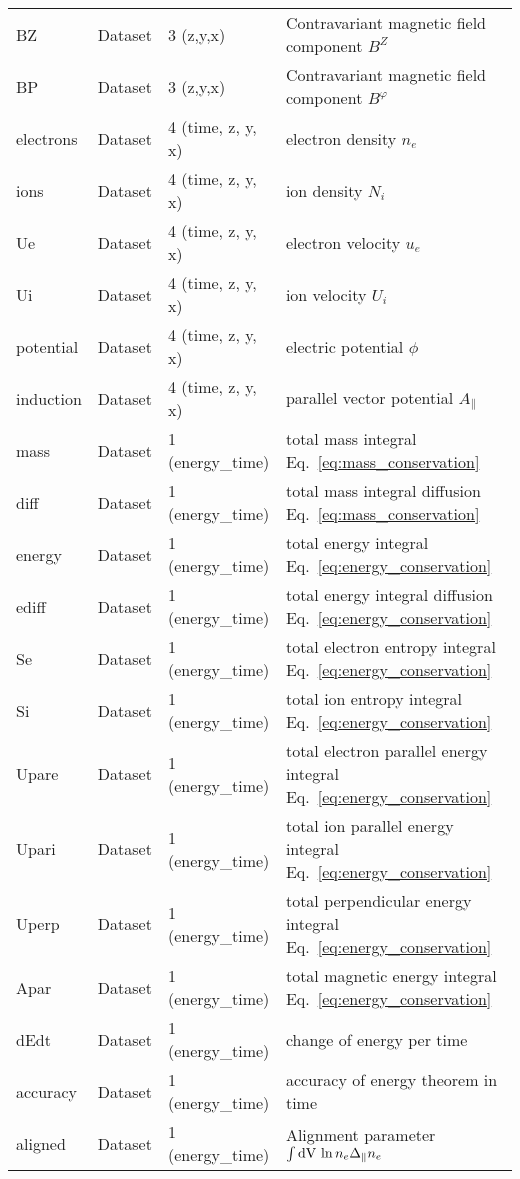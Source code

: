 \begin{longtable}{lll>{\RaggedRight}p{7cm}}
BZ               & Dataset & 3 (z,y,x) & Contravariant magnetic field component $B^Z$ \\
BP               & Dataset & 3 (z,y,x) & Contravariant magnetic field component $B^\varphi$ \\
electrons        & Dataset & 4 (time, z, y, x) & electron density $n_e$ \\
ions             & Dataset & 4 (time, z, y, x) & ion density $N_i$ \\
Ue               & Dataset & 4 (time, z, y, x) & electron velocity $u_e$ \\
Ui               & Dataset & 4 (time, z, y, x) & ion velocity $U_i$ \\
potential        & Dataset & 4 (time, z, y, x) & electric potential $\phi$ \\
induction        & Dataset & 4 (time, z, y, x) & parallel vector potential $A_\parallel$ \\
mass      & Dataset & 1 (energy\_time) & total mass integral Eq.~\eqref{eq:mass_conservation} \\
diff      & Dataset & 1 (energy\_time) & total mass integral diffusion Eq.~\eqref{eq:mass_conservation} \\
energy    & Dataset & 1 (energy\_time) & total energy integral Eq.~\eqref{eq:energy_conservation} \\
ediff     & Dataset & 1 (energy\_time) & total energy integral diffusion Eq.~\eqref{eq:energy_conservation} \\
Se        & Dataset & 1 (energy\_time) & total electron entropy integral Eq.~\eqref{eq:energy_conservation} \\
Si        & Dataset & 1 (energy\_time) & total ion entropy integral Eq.~\eqref{eq:energy_conservation} \\
Upare        & Dataset & 1 (energy\_time) & total electron parallel energy integral Eq.~\eqref{eq:energy_conservation} \\
Upari        & Dataset & 1 (energy\_time) & total ion parallel energy integral Eq.~\eqref{eq:energy_conservation} \\
Uperp     & Dataset & 1 (energy\_time) & total perpendicular energy integral Eq.~\eqref{eq:energy_conservation} \\
Apar     & Dataset & 1 (energy\_time) & total magnetic energy integral Eq.~\eqref{eq:energy_conservation} \\
dEdt      & Dataset & 1 (energy\_time) & change of energy per time  \\
accuracy  & Dataset & 1 (energy\_time) & accuracy of energy theorem in time  \\
aligned   & Dataset & 1 (energy\_time) & Alignment parameter $\int\mathrm{dV}\, \ln n_e\Delta_\parallel n_e$\\
\bottomrule
\end{longtable}
